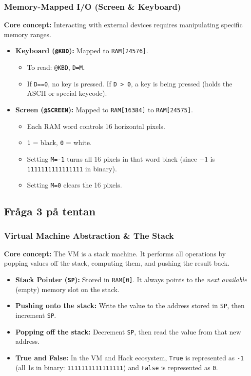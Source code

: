 \documentclass[12pt,a4paper]{article}
\begin{document}
\subsubsection*{Memory-Mapped I/O (Screen \& Keyboard)}
\textbf{Core concept:} Interacting with external devices requires manipulating specific memory ranges.
\begin{itemize}
    \item \textbf{Keyboard (\texttt{@KBD}):} Mapped to \texttt{RAM[24576]}. 
    \begin{itemize}
        \item To read: \texttt{@KBD}, \texttt{D=M}.
        \item If \texttt{D==0}, no key is pressed. If \texttt{D > 0}, a key is being pressed (holds the ASCII or special keycode).
    \end{itemize}
    \item \textbf{Screen (\texttt{@SCREEN}):} Mapped to \texttt{RAM[16384]} to \texttt{RAM[24575]}. 
    \begin{itemize}
        \item Each RAM word controls 16 horizontal pixels. 
        \item \texttt{1} = black, \texttt{0} = white. 
        \item Setting \texttt{M=-1} turns all 16 pixels in that word black (since $-1$ is \texttt{1111111111111111} in binary).
        \item Setting \texttt{M=0} clears the 16 pixels.
    \end{itemize}
\end{itemize}

\subsection*{Fråga 3 på tentan}
\subsubsection*{Virtual Machine Abstraction \& The Stack}
\textbf{Core concept:} The VM is a stack machine. It performs all operations by popping values off the stack, computing them, and pushing the result back. 
\begin{itemize}
    \item \textbf{Stack Pointer (\texttt{SP}):} Stored in \texttt{RAM[0]}. It always points to the \textit{next available} (empty) memory slot on the stack.
    \item \textbf{Pushing onto the stack:} Write the value to the address stored in \texttt{SP}, then increment \texttt{SP}.
    \item \textbf{Popping off the stack:} Decrement \texttt{SP}, then read the value from that new address.
    \item \textbf{True and False:} In the VM and Hack ecosystem, \texttt{True} is represented as \texttt{-1} (all 1s in binary: \texttt{1111111111111111}) and \texttt{False} is represented as \texttt{0}.
\end{itemize}
\end{document}
